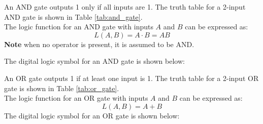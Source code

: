 \documentclass[11pt]{report}
\begin{document}
\begin{definition}
    An AND gate outputs 1 only if all inputs are 1. The truth table for a 2-input AND gate is shown in Table \ref{tab:and_gate}.
    \\
    The logic function for an AND gate with inputs $A$ and $B$ can be expressed as:
    $$
        L(A, B) = A \cdot B = AB 
    $$
    \textbf{Note} when no operator is present, it is assumed to be AND.

    The digital logic symbol for an AND gate is shown below:
    \begin{center}
    \end{center}    
\end{definition}

\begin{definition}[OR Gate]
    An OR gate outputs 1 if at least one input is 1. The truth table for a 2-input OR gate is shown in Table \ref{tab:or_gate}.
    \\
    The logic function for an OR gate with inputs $A$ and $B$ can be expressed as:
    $$
        L(A, B) = A + B
    $$
    The digital logic symbol for an OR gate is shown below:
    \begin{center}
    \end{center}
\end{definition}    
\end{document}
